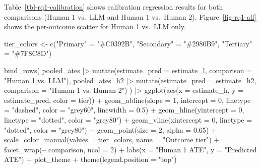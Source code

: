 \documentclass[
  letterpaper,
  DIV=11,
  numbers=noendperiod]{scrartcl}
\newenvironment{Shaded}{\begin{snugshade}}{\end{snugshade}}
\newcommand{\AttributeTok}[1]{\textcolor[rgb]{0.40,0.45,0.13}{#1}}
\newcommand{\DecValTok}[1]{\textcolor[rgb]{0.68,0.00,0.00}{#1}}
\newcommand{\FloatTok}[1]{\textcolor[rgb]{0.68,0.00,0.00}{#1}}
\newcommand{\FunctionTok}[1]{\textcolor[rgb]{0.28,0.35,0.67}{#1}}
\newcommand{\NormalTok}[1]{\textcolor[rgb]{0.00,0.23,0.31}{#1}}
\newcommand{\OtherTok}[1]{\textcolor[rgb]{0.00,0.23,0.31}{#1}}
\newcommand{\SpecialCharTok}[1]{\textcolor[rgb]{0.37,0.37,0.37}{#1}}
\newcommand{\StringTok}[1]{\textcolor[rgb]{0.13,0.47,0.30}{#1}}
\begin{document}
Table~\ref{tbl-rq1-calibration} shows calibration regression results for
both comparisons (Human 1 vs.~LLM and Human 1 vs.~Human 2).
Figure~\ref{fig-rq1-all} shows the per-outcome scatter for Human 1
vs.~LLM only.

\begin{Shaded}
\begin{Highlighting}[]
\NormalTok{tier\_colors }\OtherTok{\textless{}{-}} \FunctionTok{c}\NormalTok{(}\StringTok{"Primary"} \OtherTok{=} \StringTok{"\#C0392B"}\NormalTok{, }\StringTok{"Secondary"} \OtherTok{=} \StringTok{"\#2980B9"}\NormalTok{, }\StringTok{"Tertiary"} \OtherTok{=} \StringTok{"\#7F8C8D"}\NormalTok{)}

\FunctionTok{bind\_rows}\NormalTok{(}
\NormalTok{  pooled\_ates    }\SpecialCharTok{|\textgreater{}} \FunctionTok{mutate}\NormalTok{(}\AttributeTok{estimate\_pred =}\NormalTok{ estimate\_l,  }\AttributeTok{comparison =} \StringTok{"Human 1 vs. LLM"}\NormalTok{),}
\NormalTok{  pooled\_ates\_h2 }\SpecialCharTok{|\textgreater{}} \FunctionTok{mutate}\NormalTok{(}\AttributeTok{estimate\_pred =}\NormalTok{ estimate\_h2, }\AttributeTok{comparison =} \StringTok{"Human 1 vs. Human 2"}\NormalTok{)}
\NormalTok{) }\SpecialCharTok{|\textgreater{}}
  \FunctionTok{ggplot}\NormalTok{(}\FunctionTok{aes}\NormalTok{(}\AttributeTok{x =}\NormalTok{ estimate\_h, }\AttributeTok{y =}\NormalTok{ estimate\_pred, }\AttributeTok{color =}\NormalTok{ tier)) }\SpecialCharTok{+}
  \FunctionTok{geom\_abline}\NormalTok{(}\AttributeTok{slope =} \DecValTok{1}\NormalTok{, }\AttributeTok{intercept =} \DecValTok{0}\NormalTok{, }\AttributeTok{linetype =} \StringTok{"dashed"}\NormalTok{,}
              \AttributeTok{color =} \StringTok{"grey60"}\NormalTok{, }\AttributeTok{linewidth =} \FloatTok{0.5}\NormalTok{) }\SpecialCharTok{+}
  \FunctionTok{geom\_hline}\NormalTok{(}\AttributeTok{yintercept =} \DecValTok{0}\NormalTok{, }\AttributeTok{linetype =} \StringTok{"dotted"}\NormalTok{, }\AttributeTok{color =} \StringTok{"grey80"}\NormalTok{) }\SpecialCharTok{+}
  \FunctionTok{geom\_vline}\NormalTok{(}\AttributeTok{xintercept =} \DecValTok{0}\NormalTok{, }\AttributeTok{linetype =} \StringTok{"dotted"}\NormalTok{, }\AttributeTok{color =} \StringTok{"grey80"}\NormalTok{) }\SpecialCharTok{+}
  \FunctionTok{geom\_point}\NormalTok{(}\AttributeTok{size =} \DecValTok{2}\NormalTok{, }\AttributeTok{alpha =} \FloatTok{0.65}\NormalTok{) }\SpecialCharTok{+}
  \FunctionTok{scale\_color\_manual}\NormalTok{(}\AttributeTok{values =}\NormalTok{ tier\_colors, }\AttributeTok{name =} \StringTok{"Outcome tier"}\NormalTok{) }\SpecialCharTok{+}
  \FunctionTok{facet\_wrap}\NormalTok{(}\SpecialCharTok{\textasciitilde{}}\NormalTok{ comparison, }\AttributeTok{ncol =} \DecValTok{2}\NormalTok{) }\SpecialCharTok{+}
  \FunctionTok{labs}\NormalTok{(}\AttributeTok{x =} \StringTok{"Human 1 ATE"}\NormalTok{, }\AttributeTok{y =} \StringTok{"Predicted ATE"}\NormalTok{) }\SpecialCharTok{+}
\NormalTok{  plot\_theme }\SpecialCharTok{+}
  \FunctionTok{theme}\NormalTok{(}\AttributeTok{legend.position =} \StringTok{"top"}\NormalTok{)}
\end{Highlighting}
\end{Shaded}
\end{document}
